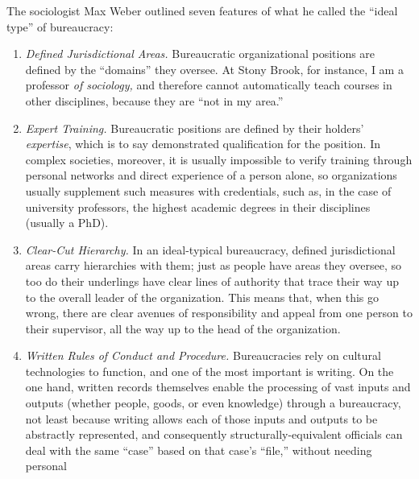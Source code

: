 \documentclass[
  letterpaper,
  DIV=11,
  numbers=noendperiod,
  oneside]{scrartcl}
\providecommand{\tightlist}{%
  \setlength{\itemsep}{0pt}\setlength{\parskip}{0pt}}
\begin{document}
The sociologist Max Weber outlined seven features of what he called the
``ideal type'' of bureaucracy:

\begin{enumerate}
\def\labelenumi{\arabic{enumi}.}
\tightlist
\item
  \emph{Defined Jurisdictional Areas.} Bureaucratic organizational
  positions are defined by the ``domains'' they oversee. At Stony Brook,
  for instance, I am a professor \emph{of sociology,} and therefore
  cannot automatically teach courses in other disciplines, because they
  are ``not in my area.''
\item
  \emph{Expert Training.} Bureaucratic positions are defined by their
  holders' \emph{expertise}, which is to say demonstrated qualification
  for the position. In complex societies, moreover, it is usually
  impossible to verify training through personal networks and direct
  experience of a person alone, so organizations usually supplement such
  measures with credentials, such as, in the case of university
  professors, the highest academic degrees in their disciplines (usually
  a PhD).
\item
  \emph{Clear-Cut Hierarchy.} In an ideal-typical bureaucracy, defined
  jurisdictional areas carry hierarchies with them; just as people have
  areas they oversee, so too do their underlings have clear lines of
  authority that trace their way up to the overall leader of the
  organization. This means that, when this go wrong, there are clear
  avenues of responsibility and appeal from one person to their
  supervisor, all the way up to the head of the organization.
\item
  \emph{Written Rules of Conduct and Procedure.} Bureaucracies rely on
  cultural technologies to function, and one of the most important is
  writing. On the one hand, written records themselves enable the
  processing of vast inputs and outputs (whether people, goods, or even
  knowledge) through a bureaucracy, not least because writing allows
  each of those inputs and outputs to be abstractly represented, and
  consequently structurally-equivalent officials can deal with the same
  ``case'' based on that case's ``file,'' without needing personal

\end{enumerate}
\end{document}
